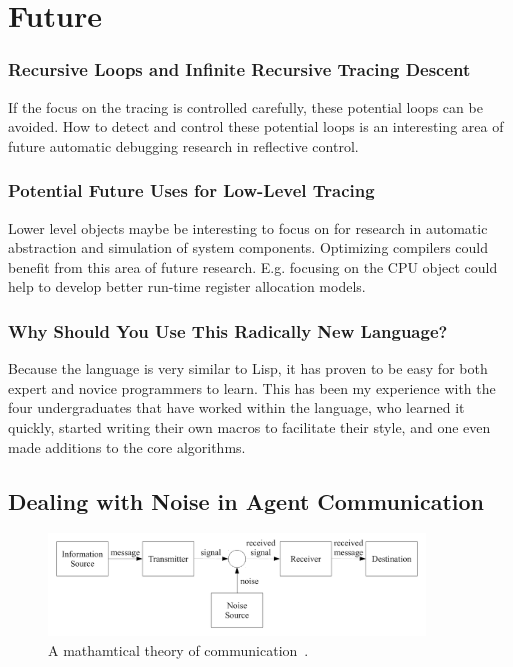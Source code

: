 \chapter{Future}\label{ch:future}

\subsection{Recursive Loops and Infinite Recursive Tracing Descent}

If the focus on the tracing is controlled carefully, these potential
loops can be avoided.  How to detect and control these potential loops
is an interesting area of future automatic debugging research in
reflective control.

\subsection{Potential Future Uses for Low-Level Tracing}

Lower level objects maybe be interesting to focus on for research in
automatic abstraction and simulation of system components.  Optimizing
compilers could benefit from this area of future research.  E.g.
focusing on the CPU object could help to develop better run-time
register allocation models.

\subsection{Why Should You Use This Radically New Language?}

Because the language is very similar to Lisp, it has proven to be easy
for both expert and novice programmers to learn.  This has been my
experience with the four undergraduates that have worked within the
language, who learned it quickly, started writing their own macros to
facilitate their style, and one even made additions to the core
algorithms.

\section{Dealing with Noise in Agent Communication}

\begin{figure}[bth]
  \center
  \includegraphics[width=10cm]{gfx/communication_theory}
  \caption[A mathematical theory of communication]{A mathamtical
    theory of communication~\citep{shannon:1959}.}
  \label{fig:communication_theory}
\end{figure}

